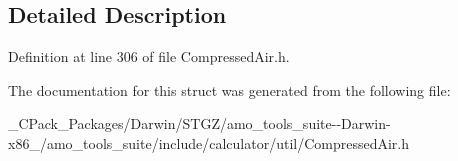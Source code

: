 \subsection{Detailed Description}


Definition at line 306 of file Compressed\+Air.\+h.



The documentation for this struct was generated from the following file\+:\begin{DoxyCompactItemize}
\item 
\+\_\+\+C\+Pack\+\_\+\+Packages/\+Darwin/\+S\+T\+G\+Z/amo\+\_\+tools\+\_\+suite-\/-\/\+Darwin-\/x86\+\_/amo\+\_\+tools\+\_\+suite/include/calculator/util/Compressed\+Air.\+h\end{DoxyCompactItemize}
